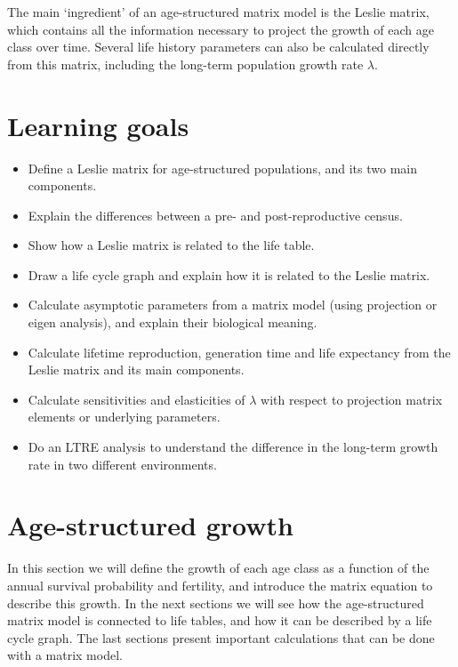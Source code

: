 \documentclass[
]{book}
\begin{document}
The main `ingredient' of an age-structured matrix model is the Leslie matrix, which contains all the information necessary to project the growth of each age class over time. Several life history parameters can also be calculated directly from this matrix, including the long-term population growth rate \(\lambda\).

\hypertarget{learning-goals-2}{%
\section{Learning goals}\label{learning-goals-2}}

\begin{itemize}
\item
  Define a Leslie matrix for age-structured populations, and its two main components.
\item
  Explain the differences between a pre- and post-reproductive census.
\item
  Show how a Leslie matrix is related to the life table.
\item
  Draw a life cycle graph and explain how it is related to the Leslie matrix.
\item
  Calculate asymptotic parameters from a matrix model (using projection or eigen analysis), and explain their biological meaning.
\item
  Calculate lifetime reproduction, generation time and life expectancy from the Leslie matrix and its main components.
\item
  Calculate sensitivities and elasticities of \(\lambda\) with respect to projection matrix elements or underlying parameters.
\item
  Do an LTRE analysis to understand the difference in the long-term growth rate in two different environments.
\end{itemize}

\hypertarget{age-structured-growth}{%
\section{Age-structured growth}\label{age-structured-growth}}

In this section we will define the growth of each age class as a function of the annual survival probability and fertility, and introduce the matrix equation to describe this growth. In the next sections we will see how the age-structured matrix model is connected to life tables, and how it can be described by a life cycle graph. The last sections present important calculations that can be done with a matrix model.
\end{document}
